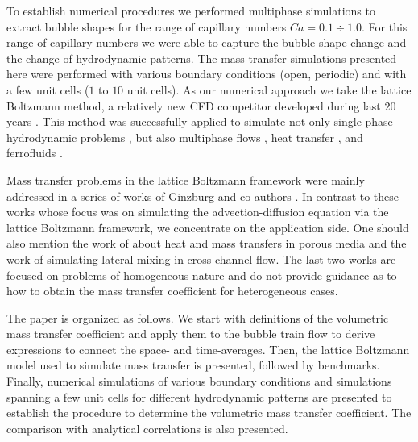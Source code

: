 \documentclass[review,12pt]{elsarticle}
\begin{document}
To establish numerical procedures we performed multiphase simulations
to extract bubble shapes
\cite{kuzmin-binary2d,kuzmin-binary3d} for the range of capillary numbers
$Ca=0.1\div 1.0$. For this range of capillary numbers
we were able to capture the bubble shape change and the change of hydrodynamic
patterns. The mass transfer simulations presented here were performed with various boundary
conditions (open, periodic) and with a few unit cells ($1$ to $10$ unit cells).
As our numerical approach we take the lattice Boltzmann method, a relatively
new CFD competitor developed during last $20$ years
\cite{frisch,mcnamara,HJ,HSB}. This method was successfully applied to simulate
not only single phase hydrodynamic problems \cite{yu}, but also multiphase
flows \cite{Shan-chen:extended,swift,gunstensen}, heat transfer
\cite{yuan-thermal,zhang-thermal}, and ferrofluids \cite{dellar-ferro,kuzmin-aniso}.

Mass transfer problems in the lattice Boltzmann framework were mainly
addressed in a series of works of Ginzburg and co-authors
\cite{ginzburg-main,ginzburg-boundary-conditions,ginzburg-saturated-flow}.
In contrast to these works whose focus was on simulating the
advection-diffusion equation via the lattice Boltzmann framework, we concentrate
on the application side.  One should also mention the work of \citet{inamuro-scalar-boundary}
about heat and mass transfers in porous media and the work of
\citet{jos-mass} simulating lateral mixing in cross-channel flow.  The last two
works are focused on problems of homogeneous nature and do not provide
guidance as to how to obtain the mass transfer coefficient for heterogeneous cases.

The paper is organized as follows. We start with definitions of the volumetric mass transfer coefficient and apply them 
to the bubble train flow to derive expressions to connect the space- and time-averages.  Then, the lattice
Boltzmann model used to simulate mass transfer is presented, followed by benchmarks. Finally,
numerical simulations of various boundary conditions and simulations spanning a few unit cells for
different hydrodynamic patterns are presented to establish the procedure to determine the
volumetric mass transfer coefficient. The comparison with analytical correlations is also presented.
\end{document}
